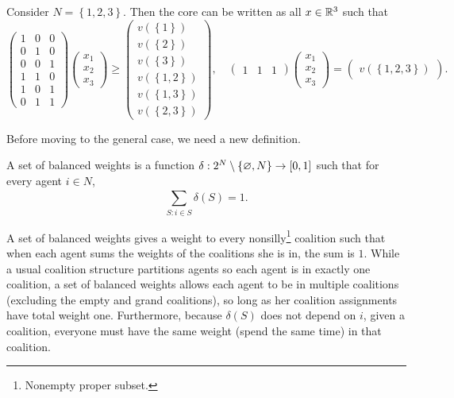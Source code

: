 Consider $N= \left\{1,2,3\right\}$. Then the core can be written as all $x \in \mathbb{R}^3$ such that \[
	\begin{pmatrix}
		1 & 0 & 0 \\
		0 & 1 & 0 \\
		0 & 0 & 1 \\
		1 & 1 & 0 \\
		1 & 0 & 1 \\
		0 & 1 & 1
	\end{pmatrix} \begin{pmatrix}
	x_1 \\
	x_2 \\
	x_3
	\end{pmatrix} 
	\ge \begin{pmatrix}
	v\left( \left\{1\right\} \right) \\
	v\left( \left\{2\right\} \right) \\ v\left( \left\{3\right\} \right) \\
	v\left( \left\{1,2\right\} \right) \\ v\left( \left\{1,3\right\} \right) \\ v\left( \left\{2,3\right\} \right)
	\end{pmatrix} , \quad \begin{pmatrix}
	1 &  1 & 1
	\end{pmatrix} \begin{pmatrix}
	x_1 \\
	x_2 \\ x_3
	\end{pmatrix} = \begin{pmatrix}
	v\left( \left\{1,2,3\right\} \right)
	\end{pmatrix} 
.\] 

Before moving to the general case, we need a new definition.
\begin{definition}
	A set of balanced weights is a function $\delta: 2^{N} \setminus \left\{\varnothing, N\right\} \to [0,1]$ such that for every agent $i \in N$, \[
		\sum\limits_{S: i \in S}^{} \delta(S) = 1
	.\] 
\end{definition}
A set of balanced weights gives a weight to every nonsilly\footnote{Nonempty proper subset.} coalition such that when each agent sums the weights of the coalitions she is in, the sum is $1$.
While a usual coalition structure partitions agents so each agent is in exactly one coalition, a set of balanced weights allows each agent to be in multiple coalitions (excluding the empty and grand coalitions), so long as her coalition assignments have total weight one.
Furthermore, because $\delta(S)$ does not depend on $i$, given a coalition, everyone must have the same weight (spend the same time) in that coalition.

